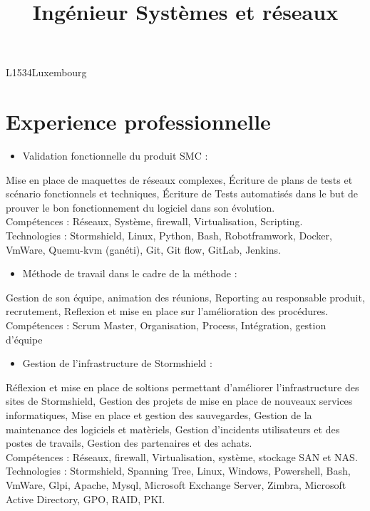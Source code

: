 

\title{Ingénieur Systèmes et réseaux} 
\address{57, rue de la forêt}{L1534}{Luxembourg}


\makecvtitle
\section{Experience professionnelle}
		{
			\begin{itemize}
				\item Validation fonctionnelle du produit SMC :
			\end{itemize}
			Mise en place de maquettes de réseaux complexes, Écriture de plans de tests et scénario fonctionnels et techniques, Écriture de Tests automatisés dans le but de prouver le bon fonctionnement du logiciel dans son évolution.\\
			\textcolor{myblue}{Compétences : Réseaux, Système, firewall, Virtualisation, Scripting.}\\
			\textcolor{myblue}{Technologies : Stormshield, Linux, Python, Bash, Robotframwork, Docker, VmWare, Quemu-kvm (ganéti), Git, Git flow, GitLab, Jenkins.}
			\begin{itemize}
				\item Méthode de travail dans le cadre de la méthode :
			\end{itemize}
			Gestion de son équipe, animation des réunions, Reporting au responsable produit, recrutement, Reflexion et mise en place sur l'amélioration des procédures.\\
			\textcolor{myblue}{Compétences : Scrum Master, Organisation, Process, Intégration, gestion d'équipe}\\
		}
	    {
		    \begin{itemize}
				\item Gestion de l'infrastructure de Stormshield :
			\end{itemize}
			Réflexion et mise en place de soltions permettant d'améliorer l'infrastructure des sites de Stormshield, Gestion des projets de mise en place de nouveaux services informatiques, Mise en place et gestion des sauvegardes, Gestion de la maintenance des logiciels et matèriels, Gestion d'incidents utilisateurs et des postes de travails, Gestion des partenaires et des achats.\\
			\textcolor{myblue}{Compétences : Réseaux, firewall, Virtualisation, système, stockage SAN et NAS.}\\
			\textcolor{myblue}{Technologies : Stormshield, Spanning Tree, Linux, Windows, Powershell, Bash, VmWare, Glpi, Apache, Mysql, Microsoft Exchange Server, Zimbra, Microsoft Active Directory, GPO, RAID, PKI.}\\
		} 	
